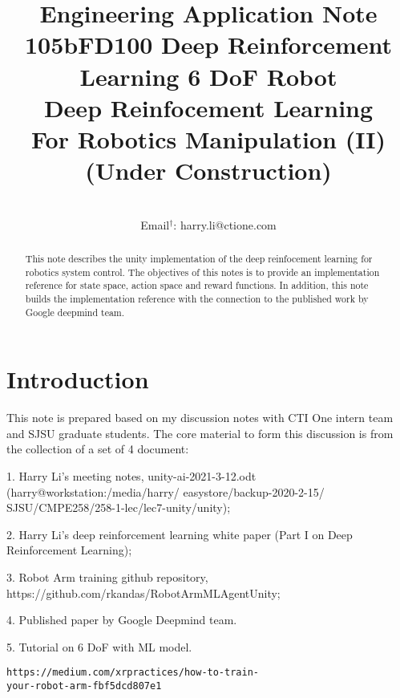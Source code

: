 \documentclass[conference]{IEEEtran}
\begin{document}
 

\title{{\small Engineering Application Note 105bFD100 Deep Reinforcement Learning 6 DoF Robot} \\
Deep Reinfocement Learning \\For Robotics Manipulation (II) \\
(Under Construction) 
}
 
\author{
 \\
Email$^{\dagger}$: harry.li@ctione.com\\
}

\maketitle
\begin{abstract}
This note describes the unity implementation of the 
deep reinfocement learning for robotics system control. 
The objectives of this notes is to provide an implementation
reference for state space, action space and reward
functions. In addition, this note builds the 
implementation reference with the connection to the 
published work by Google deepmind team.
\end{abstract}

\IEEEpeerreviewmaketitle

\section{Introduction}

This note is prepared based on my discussion notes with 
CTI One intern team and SJSU graduate students. The 
core material to form this discussion is from the 
collection of a set of 4 document:  

1. Harry Li's meeting notes, unity-ai-2021-3-12.odt 
(harry@workstation:/media/harry/ easystore/backup-2020-2-15/
SJSU/CMPE258/258-1-lec/lec7-unity/unity); 

2. Harry Li's deep reinforcement learning white paper
(Part I on Deep Reinforcement Learning); 

3. Robot Arm training github repository, 
https://github.com/rkandas/RobotArmMLAgentUnity; 

4. Published paper by Google Deepmind team. 

5. Tutorial on 6 DoF with ML model. 
\begin{verbatim}
https://medium.com/xrpractices/how-to-train-
your-robot-arm-fbf5dcd807e1
\end{verbatim}
\end{document}

